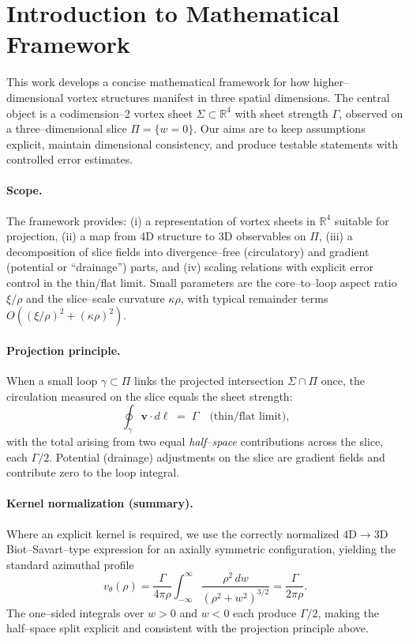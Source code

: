 \section{Introduction to Mathematical Framework}

This work develops a concise mathematical framework for how higher–dimensional vortex structures manifest in three spatial dimensions. The central object is a codimension–2 vortex sheet $\Sigma\subset\mathbb{R}^4$ with sheet strength $\Gamma$, observed on a three–dimensional slice $\Pi=\{w=0\}$. Our aims are to keep assumptions explicit, maintain dimensional consistency, and produce testable statements with controlled error estimates.

\paragraph{Scope.}
The framework provides:
(i) a representation of vortex sheets in $\mathbb{R}^4$ suitable for projection,
(ii) a map from 4D structure to 3D observables on $\Pi$,
(iii) a decomposition of slice fields into divergence–free (circulatory) and gradient (potential or ``drainage'') parts, and
(iv) scaling relations with explicit error control in the thin/flat limit.
Small parameters are the core–to–loop aspect ratio $\xi/\rho$ and the slice–scale curvature $\kappa\rho$, with typical remainder terms $O\!\left((\xi/\rho)^2+(\kappa\rho)^2\right)$.

\paragraph{Projection principle.}
When a small loop $\gamma\subset\Pi$ links the projected intersection $\Sigma\cap\Pi$ once, the circulation measured on the slice equals the sheet strength:
\[
\oint_{\gamma} \mathbf{v}\cdot d\boldsymbol{\ell}\;=\;\Gamma
\quad\text{(thin/flat limit),}
\]
with the total arising from two equal \emph{half–space} contributions across the slice, each $\Gamma/2$. Potential (drainage) adjustments on the slice are gradient fields and contribute zero to the loop integral.

\paragraph{Kernel normalization (summary).}
Where an explicit kernel is required, we use the correctly normalized 4D$\to$3D Biot–Savart–type expression for an axially symmetric configuration, yielding the standard azimuthal profile
\[
v_\theta(\rho)
=\frac{\Gamma}{4\pi\rho}\!\int_{-\infty}^{\infty}\frac{\rho^2\,dw}{(\rho^2+w^2)^{3/2}}
=\frac{\Gamma}{2\pi\rho}.
\]
The one–sided integrals over $w>0$ and $w<0$ each produce $\Gamma/2$, making the half–space split explicit and consistent with the projection principle above.

